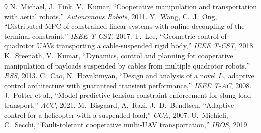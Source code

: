 \documentclass[journal,twocolumn,10pt]{IEEEtran}
\begin{document}

\begin{thebibliography}{9}
 N.~Michael, J.~Fink, V.~Kumar, ``Cooperative
  manipulation and transportation with aerial robots,''
  \emph{Autonomous Robots}, 2011.
 Y.~Wang, C.~J.~Ong, ``Distributed MPC of
  constrained linear systems with online decoupling of the
  terminal constraint,'' \emph{IEEE T-CST}, 2017.
 T.~Lee, ``Geometric control of quadrotor UAVs
  transporting a cable-suspended rigid body,'' \emph{IEEE T-CST},
  2018.
 K.~Sreenath, V.~Kumar, ``Dynamics,
  control and planning for cooperative manipulation of payloads
  suspended by cables from multiple quadrotor robots,''
  \emph{RSS}, 2013.
 C.~Cao, N.~Hovakimyan, ``Design and analysis
  of a novel $L_1$ adaptive control architecture with guaranteed
  transient performance,'' \emph{IEEE T-AC}, 2008.
 J.~Potter et al., ``Model-predictive tension
  constraint enforcement for slung-load transport,''
  \emph{ACC}, 2021.
 M.~Bisgaard, A.~Razi, J.~D.~Bendtsen,
  ``Adaptive control for a helicopter with a suspended load,''
  \emph{CCA}, 2007.
 U.~Michieli, C.~Secchi, ``Fault-tolerant
  cooperative multi-UAV transportation,''
  \emph{IROS}, 2019.
\end{thebibliography}
\end{document}
